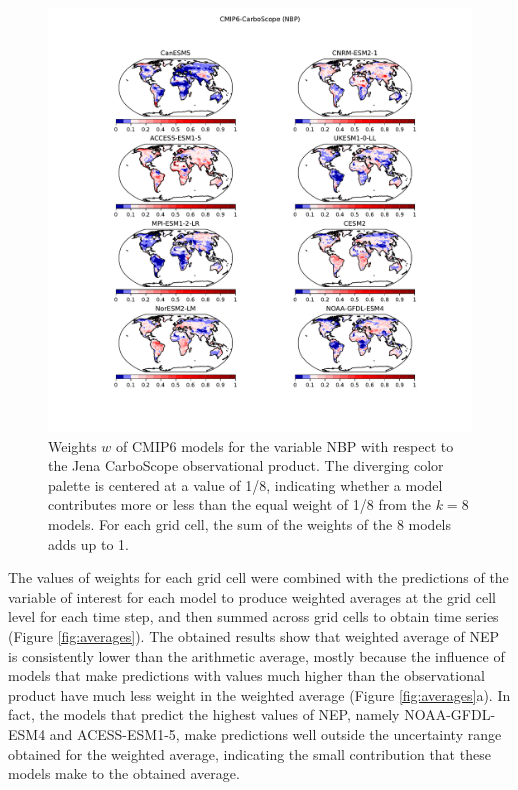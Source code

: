 \documentclass[gmd, manuscript]{copernicus}
\begin{document}
\begin{figure}[htbp]
   \centering
   \includegraphics[width=14cm, trim={3.9cm, 2cm, 3.3cm, 2.5cm}, clip]{Figures/CMIP6_CarboScope_weights.pdf} %
   \caption{Weights $w$ of CMIP6 models for the variable NBP with respect to the Jena CarboScope observational product. The diverging color palette is centered at a value of 1/8,  indicating whether a model contributes more or less than the equal weight of 1/8 from the $k= 8$ models. For each grid cell, the sum of the weights of the 8 models adds up to 1. }
   \label{fig:wCarboScope}
\end{figure}

\clearpage

The values of weights for each grid cell were combined with the predictions of the variable of interest for each model to produce weighted averages at the grid cell level for each time step, and then summed across grid cells to obtain time series (Figure \ref{fig:averages}).
The obtained results show that weighted average of NEP  is consistently lower than the arithmetic average, mostly because the influence of models that make predictions with values much higher than the observational product have much less weight in the weighted average (Figure \ref{fig:averages}a). In fact, the models that predict the highest values of NEP, namely NOAA-GFDL-ESM4 and ACESS-ESM1-5, make predictions well outside the uncertainty range obtained for the weighted average, indicating the small contribution that these models make to the obtained average. 
\end{document}
